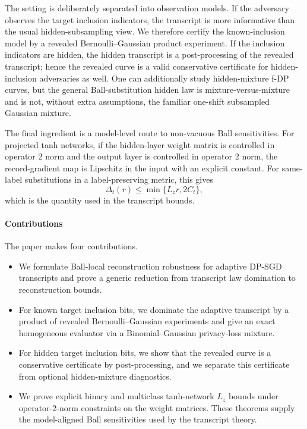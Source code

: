\documentclass[conference,compsoc]{IEEEtran}
\begin{document}
The setting is deliberately separated into observation models.  If the
adversary observes the target inclusion indicators, the transcript is more
informative than the usual hidden-subsampling view.  We therefore certify the
known-inclusion model by a revealed Bernoulli--Gaussian product experiment.  If
the inclusion indicators are hidden, the hidden transcript is a post-processing
of the revealed transcript; hence the revealed curve is a valid conservative
certificate for hidden-inclusion adversaries as well.  One can additionally
study hidden-mixture f-DP curves, but the general Ball-substitution hidden law
is mixture-versus-mixture and is not, without extra assumptions, the familiar
one-shift subsampled Gaussian mixture.

The final ingredient is a model-level route to non-vacuous Ball sensitivities.
For projected tanh networks, if the hidden-layer weight matrix is controlled in
operator 2 norm and the output layer is controlled in operator 2 norm, the
record-gradient map is Lipschitz in the input with an explicit constant.  For
same-label substitutions in a label-preserving metric, this gives
\[
\Delta_t(r)\le \min\{L_z r,2C_t\},
\]
which is the quantity used in the transcript bounds.

\paragraph{Contributions}
The paper makes four contributions.
\begin{itemize}[leftmargin=1.5em]
    \item We formulate Ball-local reconstruction robustness for adaptive
    DP-SGD transcripts and prove a generic reduction from transcript law
    domination to reconstruction bounds.
    \item For known target inclusion bits, we dominate the adaptive transcript
    by a product of revealed Bernoulli--Gaussian experiments and give an exact
    homogeneous evaluator via a Binomial--Gaussian privacy-loss mixture.
    \item For hidden target inclusion bits, we show that the revealed curve is
    a conservative certificate by post-processing, and we separate this
    certificate from optional hidden-mixture diagnostics.
    \item We prove explicit binary and multiclass tanh-network $L_z$ bounds
    under operator-2-norm constraints on the weight matrices.  These theorems
    supply the model-aligned Ball sensitivities used by the transcript theory.
\end{itemize}
\end{document}
